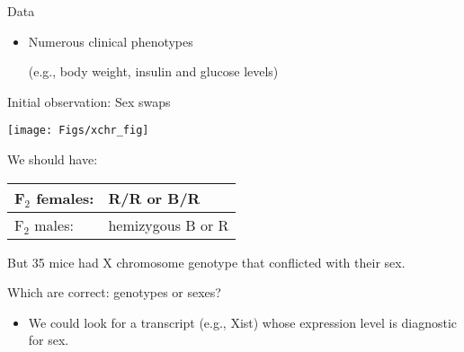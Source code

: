 \documentclass[final,plain]{beamer}
\newlength{\onecolwid}
\newlength{\halfcolwid}
\begin{document}
\begin{frame}[t]
\begin{columns}[t]
\begin{column}{\onecolwid}
\begin{block}{Data}
\begin{itemize}
            {\color{dblue} \small (adipose, gastrocnemius muscle, hypothalamus, pancreatic
          islets, kidney, liver)}

        \item Numerous clinical phenotypes 

            {\color{dblue}  \small (e.g., body weight, insulin and glucose levels)}

      \end{itemize}
    \end{block}

\vspace{45mm} %

    \begin{block}{Initial observation: Sex swaps}

      \begin{minipage}[t]{\halfcolwid}
        \vspace*{0mm}

    \centerline{\texttt{[image: Figs/xchr\_fig]}}
    \end{minipage}
      \hfill
      \begin{minipage}[t]{\halfcolwid}
        \vspace*{25mm}

    We should have:

\begin{center}
\begin{tabular}{ll}\hline
F$_{\text{2}}$ females: & {\color{dblue} R/R or B/R} \\ \hline
F$_{\text{2}}$ males: & {\color{dblue} hemizygous B or R} \\ \hline
\end{tabular} \end{center}

\vspace{48pt}

{\color{nred} But 35 mice had X chromosome genotype that conflicted with their sex.}

\end{minipage}

\end{block}

\vspace{45mm} %


\begin{block}{Which are correct: genotypes or sexes?}

\begin{itemize}
\itemsep18pt
\item We could look for a transcript (e.g., Xist) whose expression
  level is diagnostic for sex.


\end{itemize}
\end{block}
\end{column}
\end{columns}
\end{frame}
\end{document}
